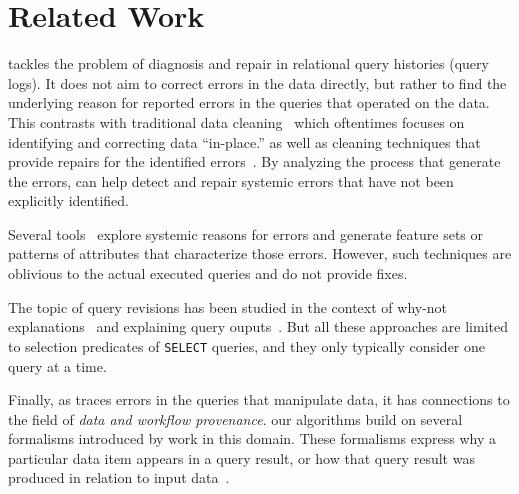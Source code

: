 
\section{Related Work}
\label{s:related}
\sys tackles the problem of diagnosis and repair in relational query
histories (query logs). It does not aim to correct errors in the data
directly, but rather to find the underlying reason for reported errors
in the queries that operated on the data. This contrasts with
traditional data 
cleaning~\cite{dallachiesa2013nadeef,Abiteboul99,Koudas2006,Galhardas2000
} which oftentimes focuses on identifying and correcting data
``in-place.'' as well as cleaning techniques that provide repairs for the
identified errors~\cite{Fan2008b, ChuIP13, Beskales2010, Cong2007, Chalamalla2014}.
By analyzing the process that generate the errors,  \sys can help detect and repair systemic 
errors that have not been explicitly identified.

Several tools~\cite{GolabKKS10, wang2015} explore systemic reasons for errors 
and generate feature sets or patterns of attributes that characterize those errors.
However, such techniques are oblivious to the actual executed queries and do not provide fixes. 

The topic of query revisions has been studied in the context of
why-not explanations~\cite{Chapman2009, tran2010conquer,tzompanaki14semi } and explaining query ouputs~\cite{Wu13,GebalyAGKS14,Roy2014}. 
But all these approaches are
limited to selection predicates of \texttt{SELECT} queries, and they
only typically consider one query at a time.

Finally, as \sys traces errors in the queries that manipulate data, it
has connections to the field of \emph{data and workflow provenance}.
our algorithms build on several formalisms introduced by work in this
domain. These formalisms express why a particular data item appears in
a query result, or how that query result was produced in relation to
input data~\cite{BunemanKT01,GKT07-semirings, CheneyCT09, CuiWW00
}.


